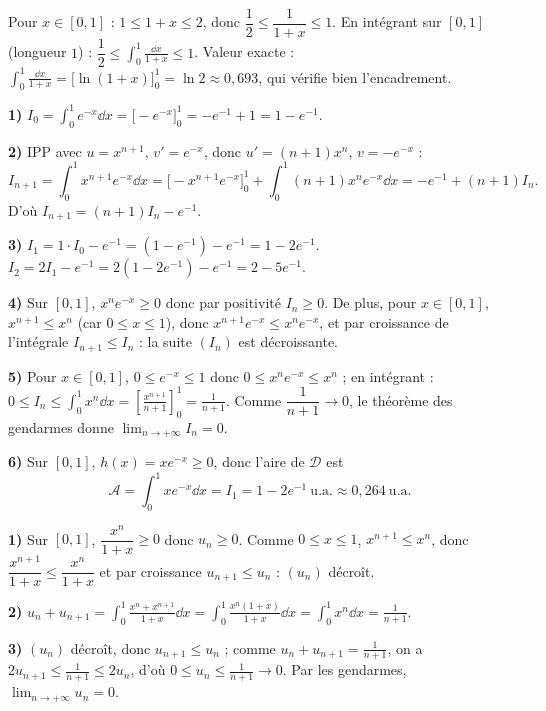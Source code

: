 Pour $x\in[0,1]$ : $1\le 1+x\le2$, donc $\dfrac12\le\dfrac{1}{1+x}\le1$. En intégrant sur $[0,1]$ (longueur $1$) :
$\dfrac12\le\displaystyle\int_0^1\frac{\dd x}{1+x}\le1$. Valeur exacte : $\displaystyle\int_0^1\frac{\dd x}{1+x}=\big[\ln(1+x)\big]_0^1=\ln 2\approx0{,}693$, qui vérifie bien l'encadrement.

\textbf{1)} $I_0=\displaystyle\int_0^1 e^{-x}\dd x=\big[-e^{-x}\big]_0^1=-e^{-1}+1=1-e^{-1}$.

\noindent\textbf{2)} IPP avec $u=x^{n+1}$, $v'=e^{-x}$, donc $u'=(n+1)x^{n}$, $v=-e^{-x}$ :
\[
I_{n+1}=\int_0^1 x^{n+1}e^{-x}\dd x=\big[-x^{n+1}e^{-x}\big]_0^1+\int_0^1(n+1)x^{n}e^{-x}\dd x=-e^{-1}+(n+1)I_n.
\]
D'où $I_{n+1}=(n+1)I_n-e^{-1}$.

\noindent\textbf{3)} $I_1=1\cdot I_0-e^{-1}=(1-e^{-1})-e^{-1}=1-2e^{-1}$.\;
$I_2=2I_1-e^{-1}=2(1-2e^{-1})-e^{-1}=2-5e^{-1}$.

\noindent\textbf{4)} Sur $[0,1]$, $x^n e^{-x}\ge0$ donc par positivité $I_n\ge0$. De plus, pour $x\in[0,1]$,
$x^{n+1}\le x^n$ (car $0\le x\le1$), donc $x^{n+1}e^{-x}\le x^n e^{-x}$, et par croissance de l'intégrale
$I_{n+1}\le I_n$ : la suite $(I_n)$ est décroissante.

\noindent\textbf{5)} Pour $x\in[0,1]$, $0\le e^{-x}\le1$ donc $0\le x^n e^{-x}\le x^n$ ; en intégrant :
$0\le I_n\le\displaystyle\int_0^1 x^n\dd x=\left[\frac{x^{n+1}}{n+1}\right]_0^1=\frac{1}{n+1}$.
Comme $\dfrac{1}{n+1}\to0$, le théorème des gendarmes donne $\displaystyle\lim_{n\to+\infty}I_n=0$.

\noindent\textbf{6)} Sur $[0,1]$, $h(x)=x e^{-x}\ge0$, donc l'aire de $\mathcal D$ est
\[
\mathcal A=\int_0^1 x e^{-x}\dd x=I_1=1-2e^{-1}\ \text{u.a.}\approx0{,}264\ \text{u.a.}
\]

\textbf{1)} Sur $[0,1]$, $\dfrac{x^n}{1+x}\ge0$ donc $u_n\ge0$. Comme $0\le x\le1$, $x^{n+1}\le x^n$,
donc $\dfrac{x^{n+1}}{1+x}\le\dfrac{x^n}{1+x}$ et par croissance $u_{n+1}\le u_n$ : $(u_n)$ décroît.

\noindent\textbf{2)} $u_n+u_{n+1}=\displaystyle\int_0^1\frac{x^n+x^{n+1}}{1+x}\dd x=\int_0^1\frac{x^n(1+x)}{1+x}\dd x
=\int_0^1 x^n\dd x=\frac1{n+1}$.

\noindent\textbf{3)} $(u_n)$ décroît, donc $u_{n+1}\le u_n$ ; comme $u_n+u_{n+1}=\frac1{n+1}$,
on a $2u_{n+1}\le\frac1{n+1}\le 2u_n$, d'où $0\le u_n\le\frac1{n+1}\to0$. Par les gendarmes,
$\displaystyle\lim_{n\to+\infty}u_n=0$.

